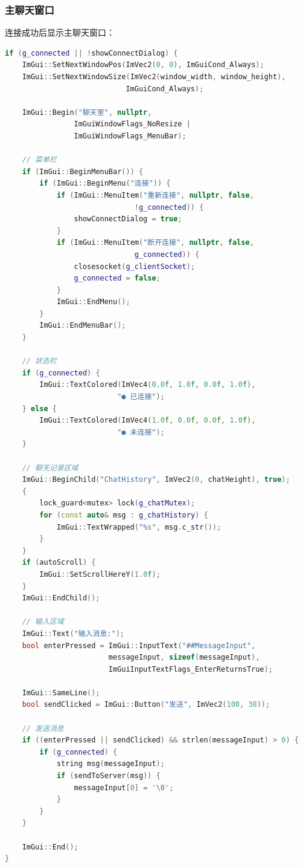 \documentclass[12pt, a4paper]{article}
\begin{document}
\subsubsection{主聊天窗口}

连接成功后显示主聊天窗口：

\begin{lstlisting}[language=c++]
if (g_connected || !showConnectDialog) {
    ImGui::SetNextWindowPos(ImVec2(0, 0), ImGuiCond_Always);
    ImGui::SetNextWindowSize(ImVec2(window_width, window_height), 
                            ImGuiCond_Always);
    
    ImGui::Begin("聊天室", nullptr, 
                ImGuiWindowFlags_NoResize | 
                ImGuiWindowFlags_MenuBar);
    
    // 菜单栏
    if (ImGui::BeginMenuBar()) {
        if (ImGui::BeginMenu("连接")) {
            if (ImGui::MenuItem("重新连接", nullptr, false, 
                              !g_connected)) {
                showConnectDialog = true;
            }
            if (ImGui::MenuItem("断开连接", nullptr, false, 
                              g_connected)) {
                closesocket(g_clientSocket);
                g_connected = false;
            }
            ImGui::EndMenu();
        }
        ImGui::EndMenuBar();
    }
    
    // 状态栏
    if (g_connected) {
        ImGui::TextColored(ImVec4(0.0f, 1.0f, 0.0f, 1.0f), 
                          "● 已连接");
    } else {
        ImGui::TextColored(ImVec4(1.0f, 0.0f, 0.0f, 1.0f), 
                          "● 未连接");
    }
    
    // 聊天记录区域
    ImGui::BeginChild("ChatHistory", ImVec2(0, chatHeight), true);
    {
        lock_guard<mutex> lock(g_chatMutex);
        for (const auto& msg : g_chatHistory) {
            ImGui::TextWrapped("%s", msg.c_str());
        }
    }
    if (autoScroll) {
        ImGui::SetScrollHereY(1.0f);
    }
    ImGui::EndChild();
    
    // 输入区域
    ImGui::Text("输入消息:");
    bool enterPressed = ImGui::InputText("##MessageInput", 
                        messageInput, sizeof(messageInput), 
                        ImGuiInputTextFlags_EnterReturnsTrue);
    
    ImGui::SameLine();
    bool sendClicked = ImGui::Button("发送", ImVec2(100, 38));
    
    // 发送消息
    if ((enterPressed || sendClicked) && strlen(messageInput) > 0) {
        if (g_connected) {
            string msg(messageInput);
            if (sendToServer(msg)) {
                messageInput[0] = '\0';
            }
        }
    }
    
    ImGui::End();
}
\end{lstlisting}
\end{document}
